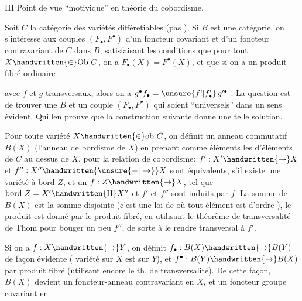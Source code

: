 
III \quad Point de vue ``motivique'' en théorie du cobordisme.

Soit $C$ la catégorie des variétés différetiables  (pas  ),  Si $B$ est une catégorie, on s'intéresse aux couples $(F_{\bullet},F^{\bullet})$ d'un foncteur covariant et d'un foncteur contravariant de $C$ dans $B$, satisfaisant les conditions que pour tout $X\handwritten{\in}\mathrm{Ob}\ C$, on a $F_{\bullet}(X)=F^{\bullet}(X)$, et que si on a un produit fibré ordinaire


avec $f$ et $g$ transversaux, alors on a $g^{\bullet}f_{\bullet}=\unsure{f!|f'_{\bullet}}\,g'^{\bullet}$ . La question est de trouver une $B$ et un couple $(F_{\bullet},F^{\bullet})$ qui soient ``universels'' dans un sens évident. Quillen prouve que la construction suivante donne une telle solution.

Pour toute variété $X\handwritten{\in}\mathrm{ob}\ C$, on définit un anneau commutatif $B(X)$ (l'anneau de bordisme de $X$) en prenant comme éléments les   d'éléments de $C$ au dessus de $X$, pour la relation de cobordisme: $f':X'\handwritten{\to}X$ et $f'':X''\handwritten{\unsure{-|\to}}X$ sont équivalents, s'il existe une variété à bord $Z$, et un $f:Z\handwritten{\to}X$, tel que $\mathrm{bord}\ Z=X'\handwritten{\amalg}X''$ et $f'$ et $f''$ sont induits par $f$. La somme de $B(X)$ est la somme disjointe (c'est une loi de   où tout élément est d'ordre  ), le produit est donné par le produit fibré, en utilisant le théorème de transversalité de Thom pour bouger un peu $f''$, de sorte à le rendre transversal à $f'$.


Si on a $f:X\handwritten{\to}Y$, on définit $f_{\bullet}:B(X)\handwritten{\to}B(Y)$ de façon évidente ( variété sur $X$ est sur $Y$), et $f^{\bullet}:B(Y)\handwritten{\to}B(X)$ par produit fibré (utilisant encore le th. de transversalité). De cette façon, $B(X)$ devient un foncteur-anneau  contravariant en $X$, et un foncteur groupe covariant en


